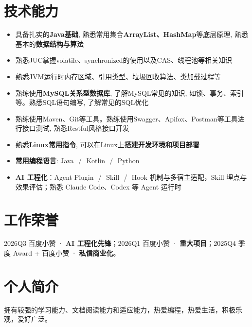 \documentclass{resume}
\begin{document}
\section{技术能力}
\begin{itemize}[parsep=0.2ex]
  \item 具备扎实的\textbf{Java基础}, 熟悉常用集合\textbf{ArrayList、HashMap}等底层原理, 熟悉基本的\textbf{数据结构与算法}
  \item 熟悉JUC掌握volatile、synchronized的使用以及CAS、线程池等相关知识
  \item 熟悉JVM运行时内存区域、引用类型、垃圾回收算法、类加载过程等
  \item 熟练使用\textbf{MySQL关系型数据库}, 了解MySQL常见的知识, 如锁、事务、索引等。熟悉SQL语句编写, 了解常见的SQL优化
  \item 熟练使用Maven、Git等工具。熟练使用Swagger、Apifox、Postman等工具进行接口测试, 熟悉Restful风格接口开发
  \item 熟悉\textbf{Linux常用指令}, 可以在Linux上\textbf{搭建开发环境和项目部署}
  \item \textbf{常用编程语言}: Java~\,/\,~Kotlin~\,/\,~Python
  \item \textbf{AI 工程化}：Agent Plugin~\,/\,~Skill~\,/\,~Hook 机制与多宿主适配，Skill 埋点与效果评估；熟悉 Claude Code、Codex 等 Agent 运行时
\end{itemize}

\section{工作荣誉}
\noindent 2026Q3 百度小赞 · \textbf{AI 工程化先锋}；2026Q1 百度小赞 · \textbf{重大项目}；2025Q4 季度 Award + 百度小赞 · \textbf{私信商业化}。

\section{个人简介}
拥有较强的学习能力、文档阅读能力和适应能力，热爱编程，热爱生活，积极乐观，爱好广泛。

%
%
\end{document}
